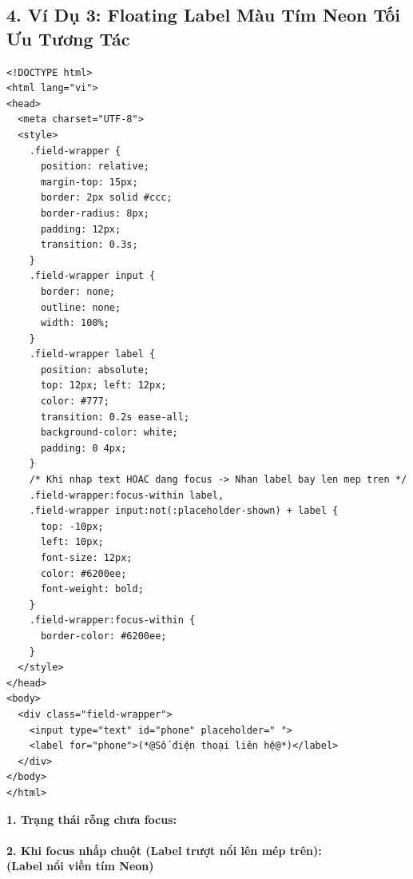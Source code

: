 \documentclass[11pt,oneside]{book}
\begin{document}
\subsection{4. Ví Dụ 3: Floating Label Màu Tím Neon Tối Ưu Tương Tác}

\begin{codeWindow}
\begin{lstlisting}[language=HTML5]
<!DOCTYPE html>
<html lang="vi">
<head>
  <meta charset="UTF-8">
  <style>
    .field-wrapper {
      position: relative;
      margin-top: 15px;
      border: 2px solid #ccc;
      border-radius: 8px;
      padding: 12px;
      transition: 0.3s;
    }
    .field-wrapper input {
      border: none;
      outline: none;
      width: 100%;
    }
    .field-wrapper label {
      position: absolute;
      top: 12px; left: 12px;
      color: #777;
      transition: 0.2s ease-all;
      background-color: white;
      padding: 0 4px;
    }
    /* Khi nhap text HOAC dang focus -> Nhan label bay len mep tren */
    .field-wrapper:focus-within label,
    .field-wrapper input:not(:placeholder-shown) + label {
      top: -10px;
      left: 10px;
      font-size: 12px;
      color: #6200ee;
      font-weight: bold;
    }
    .field-wrapper:focus-within {
      border-color: #6200ee;
    }
  </style>
</head>
<body>
  <div class="field-wrapper">
    <input type="text" id="phone" placeholder=" ">
    <label for="phone">(*@Số điện thoại liên hệ@*)</label>
  </div>
</body>
</html>
\end{lstlisting}
\end{codeWindow}

\begin{browserWindow}
\sffamily\small
\textbf{1. Trạng thái rỗng chưa focus:}\\[2pt]
\\[8pt]
\textbf{2. Khi focus nhấp chuột (Label trượt nổi lên mép trên):}\\[2pt]
 \quad \textcolor{purple!80!black}{\bfseries (Label nổi viền tím Neon)}
\end{browserWindow}
\end{document}
